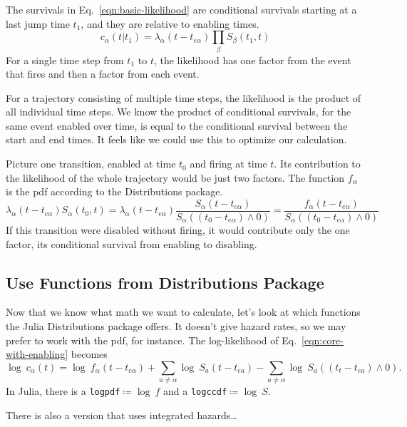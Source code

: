 \documentclass{article}
\begin{document}
The survivals in Eq.~\ref{eqn:basic-likelihood} are conditional survivals starting at a last jump time $t_1$, and they are relative to enabling times.
\begin{equation}
	c_{\alpha}(t|t_1) = \lambda_{\alpha}(t-t_{e\alpha})\prod_\beta S_{\beta}(t_1,t)\label{eqn:core-with-enabling}
\end{equation}
For a single time step from $t_1$ to $t$, the likelihood has one factor from the event that fires and then a factor from each event.

For a trajectory consisting of multiple time steps, the likelihood is the product of all individual time steps. We know the product of conditional survivals, for the same event enabled over time, is equal to the conditional survival between the start and end times. It feels like we could use this to optimize our calculation.

Picture one transition, enabled at time $t_0$ and firing at time $t$. Its contribution to the likelihood of the whole trajectory would be just two factors. The function $f_\alpha$ is the pdf according to the Distributions package.
\begin{equation}
	\lambda_{\alpha}(t-t_{e\alpha})S_{\alpha}(t_0,t)
	=\lambda_{\alpha}(t-t_{e\alpha})\frac{S_{\alpha}(t-t_{e\alpha})}{S_{\alpha}((t_0-t_{e\alpha})\wedge 0)}
	=\frac{f_{\alpha}(t-t_{e\alpha})}{S_{\alpha}((t_0-t_{e\alpha})\wedge 0)}\label{eqn:event-lifetime-likelihood}
\end{equation}
If this transition were disabled without firing, it would contribute only the one factor, its conditional survival from enabling to disabling.

\subsection{Use Functions from Distributions Package}
Now that we know what math we want to calculate, let's look at which functions the Julia Distributions package offers. It doesn't give hazard rates, so we may prefer to work with the pdf, for instance. The log-likelihood of Eq.~\ref{eqn:core-with-enabling} becomes
\begin{equation}
  \log\:c_{\alpha}(t) = \log\:f_\alpha(t-t_{e\alpha})+\sum_{a\ne\alpha} \log\:S_a(t-t_{ea}) - \sum_{a\ne\alpha} \log\:S_a((t_t-t_{ea})\wedge 0).
\end{equation}
In Julia, there is a \texttt{logpdf}$\coloneqq\log\:f$ and a \texttt{logccdf}$\coloneqq\log\:S$.

There is also a version that uses integrated hazards\ldots
\end{document}
